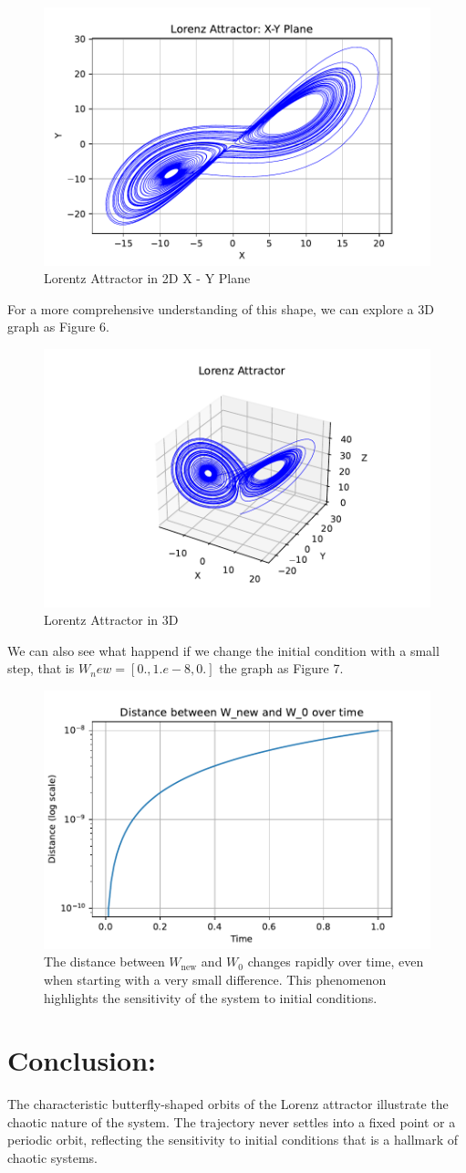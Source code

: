 \documentclass[12pt, letterpaper] {article}
\begin{document}
\begin{figure}[h!]
    \centering
    \includegraphics[width=0.5\linewidth, keepaspectratio]{Q2_figure_2_2.pdf}
    \caption{Lorentz Attractor in 2D X - Y Plane }
    \label{fig:Lorenz Attractor: Y-Z Plane}
\end{figure}

\clearpage
For a more comprehensive understanding of this shape, we can explore a 3D graph as Figure 6.

\begin{figure}[h!]
    \centering
    \includegraphics[width=0.5\linewidth, keepaspectratio]{Q2_figure_3.pdf}
    \caption{Lorentz Attractor in 3D }
    \label{fig:Lorenz Attractor 3D}
\end{figure}


We can also see what happend if we change the initial condition with a small step, that is $W_new = [0., 1.e-8, 0.]$ the graph as Figure 7.

\begin{figure}[h!]
    \centering
    \includegraphics[width=0.5\linewidth, keepaspectratio]{Q2_figure_4.pdf}
    \caption{The distance between \( W_{\text{new}} \) and \( W_0 \) changes rapidly over time, even when starting with a very small difference. This phenomenon highlights the sensitivity of the system to initial conditions.}
    \label{fig:Distance between W_new and W_0 over time}
\end{figure}



\section{Conclusion:}

The characteristic butterfly-shaped orbits of the Lorenz attractor illustrate the chaotic nature of the system. The trajectory never settles into a fixed point or a periodic orbit, reflecting the sensitivity to initial conditions that is a hallmark of chaotic systems.
\end{document}
